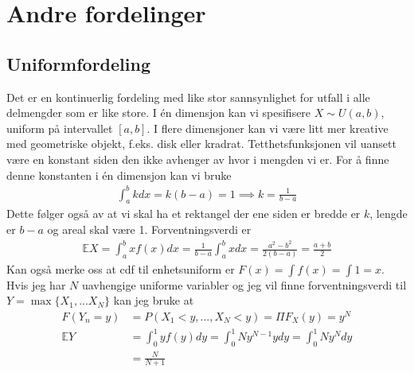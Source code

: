 \section{Andre fordelinger}
\subsection{Uniformfordeling}
Det er en kontinuerlig fordeling med like stor sannsynlighet for utfall i alle delmengder som er like store. I én dimensjon kan vi spesifisere $X\sim U(a,b)$, uniform på intervallet $[a,b]$. I flere dimensjoner kan vi være litt mer kreative med geometriske objekt, f.eks. disk eller kradrat. Tetthetsfunksjonen vil uansett være en konstant siden den ikke avhenger av hvor i mengden vi er. For å finne denne konstanten i én dimensjon kan vi bruke
\begin{align}
\int_a^b k dx = k(b-a)=1 \implies k = \frac{1}{b-a}
\end{align}
Dette følger også av at vi skal ha et rektangel der ene siden er bredde er $k$, lengde er $b-a$ og areal skal være 1. Forventningsverdi er
\begin{align}
\mathbb{E}X = \int_a^b x f(x)dx = \frac{1}{b-a} \int_a^b x dx = \frac{a^2-b^2}{2(b-a)} = \frac{a+b}{2}
\end{align}
Kan også merke oss at cdf til enhetsuniform er $F(x) = \int f(x) = \int 1 = x$. Hvis jeg har $N$ uavhengige uniforme variabler og jeg vil finne forventningsverdi til $Y=\max\{X_1,...X_N\}$ kan jeg bruke at
\begin{align}
F(Y_n=y) &= P(X_1<y,...,X_N<y) = \Pi F_X(y)=y^N \\
\mathbb{E}Y &= \int_0^1 y f(y)dy = \int_0^1 Ny^{N-1}ydy = \int_0^1 Ny^{N}dy \\
&= \frac{N}{N+1}
\end{align}
